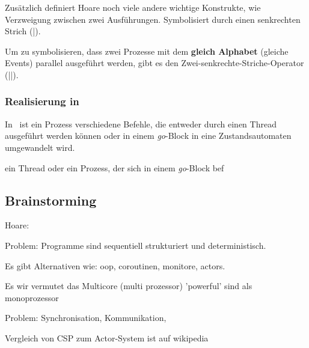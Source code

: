 Zusätzlich definiert Hoare noch viele andere wichtige Konstrukte, wie Verzweigung zwischen zwei Ausführungen. Symbolisiert durch einen senkrechten Strich (|).

Um zu symbolisieren, dass zwei Prozesse mit dem \textbf{gleich Alphabet} (gleiche Events) parallel ausgeführt werden, gibt es den Zwei-senkrechte-Striche-Operator (||).


\subsubsection{Realisierung in \CA}
In \CA\ ist ein Prozess verschiedene Befehle, die entweder durch einen Thread ausgeführt werden können oder in einem \textit{go}-Block in eine Zustandsautomaten umgewandelt wird.





ein Thread oder ein Prozess, der sich in einem \textit{go}-Block bef


\subsection{Brainstorming}

Hoare:

Problem:
Programme sind sequentiell strukturiert und deterministisch.

Es gibt Alternativen wie: oop, coroutinen, monitore, actors.

Es wir vermutet das Multicore (multi prozessor) 'powerful' sind als monoprozessor

Problem: Synchronisation, Kommunikation,

Vergleich von CSP zum Actor-System ist auf wikipedia


